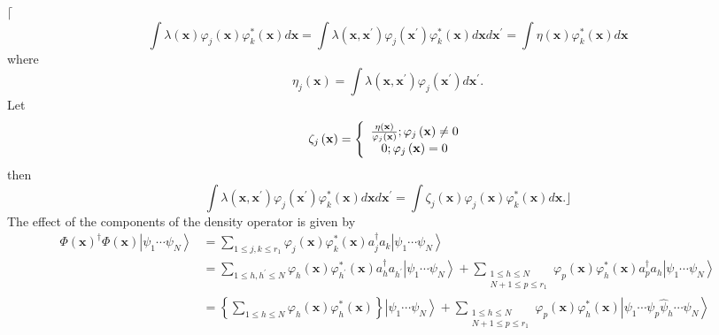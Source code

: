 \documentclass[aps,preprint]{revtex4}%
\begin{document}
$\lceil$%
\[
\int\lambda\left(  \mathbf{x}\right)  \varphi_{j}\left(  \mathbf{x}\right)
\varphi_{k}^{\ast}\left(  \mathbf{x}\right)  d\mathbf{x=}\int\lambda\left(
\mathbf{x,x}^{\prime}\right)  \varphi_{j}\left(  \mathbf{x}^{\prime}\right)
\varphi_{k}^{\ast}\left(  \mathbf{x}\right)  d\mathbf{x}d\mathbf{x}^{\prime
}=\int\eta\left(  \mathbf{x}\right)  \varphi_{k}^{\ast}\left(  \mathbf{x}%
\right)  d\mathbf{x}%
\]
where%
\[
\eta_{j}\left(  \mathbf{x}\right)  =\int\lambda\left(  \mathbf{x,x}^{\prime
}\right)  \varphi_{j}\left(  \mathbf{x}^{\prime}\right)  d\mathbf{x}^{\prime}.
\]
Let
\[
\zeta_{j}\left(  \mathbf{x}\right)  =\left\{
\begin{array}
[c]{c}%
\frac{\eta\left(  \mathbf{x}\right)  }{\varphi_{j}\left(  \mathbf{x}\right)
};\varphi_{j}\left(  \mathbf{x}\right)  \neq0\\
0;\varphi_{j}\left(  \mathbf{x}\right)  =0
\end{array}
\right.
\]
then
\[
\int\lambda\left(  \mathbf{x,x}^{\prime}\right)  \varphi_{j}\left(
\mathbf{x}^{\prime}\right)  \varphi_{k}^{\ast}\left(  \mathbf{x}\right)
d\mathbf{x}d\mathbf{x}^{\prime}=\int\zeta_{j}\left(  \mathbf{x}\right)
\varphi_{j}\left(  \mathbf{x}\right)  \varphi_{k}^{\ast}\left(  \mathbf{x}%
\right)  d\mathbf{x.\rfloor}%
\]
The effect of the components of the density operator is given by
\begin{align*}
\Phi\left(  \mathbf{x}\right)  ^{\dagger}\Phi\left(  \mathbf{x}\right)
\left\vert \psi_{1}\cdots\psi_{N}\right\rangle  &  =\sum_{1\leq j,k\leq r_{1}%
}\varphi_{j}\left(  \mathbf{x}\right)  \varphi_{k}^{\ast}\left(
\mathbf{x}\right)  a_{j}^{\dagger}a_{k}\left\vert \psi_{1}\cdots\psi
_{N}\right\rangle \\
&  =\sum_{1\leq h,h^{\prime}\leq N}\varphi_{h}\left(  \mathbf{x}\right)
\varphi_{h^{\prime}}^{\ast}\left(  \mathbf{x}\right)  a_{h}^{\dagger
}a_{h^{\prime}}\left\vert \psi_{1}\cdots\psi_{N}\right\rangle +\sum
_{\substack{1\leq h\leq N\\N+1\leq p\leq r_{1}}}\varphi_{p}\left(
\mathbf{x}\right)  \varphi_{h}^{\ast}\left(  \mathbf{x}\right)  a_{p}%
^{\dagger}a_{h}\left\vert \psi_{1}\cdots\psi_{N}\right\rangle \\
&  =\left\{  \sum_{1\leq h\leq N}\varphi_{h}\left(  \mathbf{x}\right)
\varphi_{h}^{\ast}\left(  \mathbf{x}\right)  \right\}  \left\vert \psi
_{1}\cdots\psi_{N}\right\rangle +\sum_{\substack{1\leq h\leq N\\N+1\leq p\leq
r_{1}}}\varphi_{p}\left(  \mathbf{x}\right)  \varphi_{h}^{\ast}\left(
\mathbf{x}\right)  \left\vert \psi_{1}\cdots\psi_{p}\widehat{\psi}_{h}%
\cdots\psi_{N}\right\rangle
\end{align*}
\end{document}
